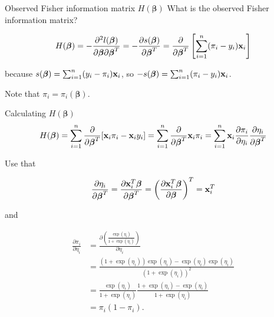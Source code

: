 \documentclass[
  ignorenonframetext,
]{beamer}
\begin{document}
\begin{frame}
\begin{block}{Observed Fisher information matrix
\(H(\boldsymbol{\beta})\)}
\protect\hypertarget{observed-fisher-information-matrix-hboldsymbolbeta}{}
What is the observed Fisher information matrix?

\[H(\boldsymbol{\beta}) = -\frac{\partial^2l(\boldsymbol{\beta})}{\partial\boldsymbol{\beta}\partial\boldsymbol{\beta}^T} = -\frac{\partial s(\boldsymbol{\beta})}{\partial\boldsymbol{\beta}^T} = \frac{\partial}{\partial\boldsymbol{\beta}^T}\left[\sum_{i=1}^n (\pi_i-y_i){\bf x}_i \right] \]

because \(s(\boldsymbol{\beta}) = \sum_{i=1}^n (y_i-\pi_i){\bf x}_i\),
so \(-s(\boldsymbol{\beta}) = \sum_{i=1}^n (\pi_i-y_i){\bf x}_i\).

Note that \(\pi_i = \pi_i(\boldsymbol{\beta})\).
\end{block}
\end{frame}

\begin{frame}
\begin{block}{Calculating \(H(\boldsymbol{\beta})\)}
\protect\hypertarget{calculating-hboldsymbolbeta}{}
\[H(\boldsymbol{\beta}) = \sum_{i=1}^n \frac{\partial}{\partial\boldsymbol{\beta}^T}[{\bf x}_i\pi_i-{\bf x}_iy_i] = \sum_{i=1}^n \frac{\partial}{\partial\boldsymbol{\beta}^T}{\bf x}_i\pi_i = \sum_{i=1}^n {\bf x}_i \frac{\partial \pi_i}{\partial \eta_i} \frac{\partial \eta_i}{\partial \boldsymbol{\beta}^T} \]
\end{block}
\end{frame}

\begin{frame}
Use that

\[ \frac{\partial \eta_i}{\partial \boldsymbol{\beta}^T}=\frac{\partial {\bf x}_i^T\boldsymbol{\beta}}{\partial \boldsymbol{\beta}^T} = \left(\frac{\partial {\bf x}_i^T\boldsymbol{\beta}}{\partial \boldsymbol{\beta}}\right)^T = {\bf x}_i^T \]

and

\[
\begin{aligned}
\frac{\partial \pi_i}{\partial \eta_i} &=  \frac{\partial\left(\frac{\exp(\eta_i)}{1+\exp(\eta_i)}\right)}{\partial \eta_i}\\ &= \frac{(1+\exp(\eta_i))\exp(\eta_i) - \exp(\eta_i)\exp(\eta_i)}{(1+\exp(\eta_i))^2} \\
&= \frac{\exp(\eta_i)}{1+\exp(\eta_i)} \frac{1+\exp(\eta_i)-\exp(\eta_i)}{1+\exp(\eta_i)} \\
&=\pi_i (1-\pi_i).
\end{aligned}
\]
\end{frame}
\end{document}
